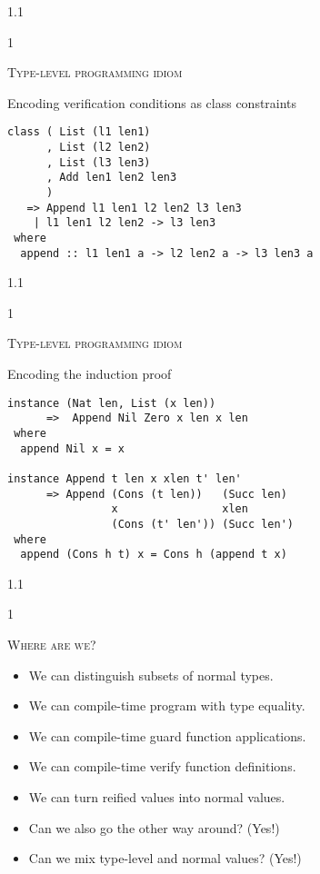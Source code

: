 \documentclass{slides}
\newcommand{\header}[1]{{\large\scshape \color{Red} #1} \medskip }
\newcommand{\blau}[1]{{\color{Blue} #1} \medskip }
\newenvironment{myslide}{\begin{slide}\color{Blue}\begin{boxedminipage}{1.1\hsize}\begin{boxedminipage}{1\hsize}\color{Black}
\vspace{-170\in}
}{%
\smallskip
\end{boxedminipage}
\end{boxedminipage}
\end{slide}}
\begin{document}



\begin{myslide}

\header{Type-level programming idiom}

\blau{Encoding verification conditions as class constraints}

\medskip

\begin{Verbatim}[fontseries=normal,fontsize=\tiny]
class ( List (l1 len1)
      , List (l2 len2)
      , List (l3 len3)
      , Add len1 len2 len3
      )
   => Append l1 len1 l2 len2 l3 len3
    | l1 len1 l2 len2 -> l3 len3
 where
  append :: l1 len1 a -> l2 len2 a -> l3 len3 a
\end{Verbatim}

\end{myslide}






\begin{myslide}

\header{Type-level programming idiom}

\blau{Encoding the induction proof}

\begin{Verbatim}[fontseries=normal,fontsize=\tiny]
instance (Nat len, List (x len))
      =>  Append Nil Zero x len x len
 where   
  append Nil x = x

instance Append t len x xlen t' len'
      => Append (Cons (t len))   (Succ len)
                x                xlen
                (Cons (t' len')) (Succ len')
 where
  append (Cons h t) x = Cons h (append t x)
\end{Verbatim}

\end{myslide}






\begin{myslide}

\header{Where are we?}

\begin{itemize}
\item We can distinguish subsets of normal types.
\item We can compile-time program with type equality.
\item We can compile-time guard function applications.
\item We can compile-time verify function definitions.
\item We can turn reified values into normal values.
\item Can we also go the other way around? (Yes!)
\item Can we mix type-level and normal values? (Yes!)
\end{itemize}

\end{myslide}
\end{document}
